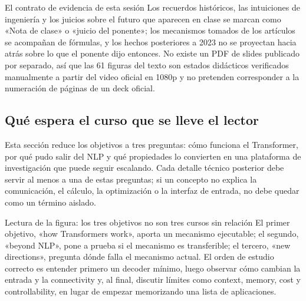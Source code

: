 \begin{importantbox}{El contrato de evidencia de esta sesión}
Los recuerdos históricos, las intuiciones de ingeniería y los juicios sobre el futuro que aparecen en clase se marcan como «Nota de clase» o «juicio del ponente»; los mecanismos tomados de los artículos se acompañan de fórmulas, y los hechos posteriores a 2023 no se proyectan hacia atrás sobre lo que el ponente dijo entonces. No existe un PDF de slides publicado por separado, así que las 61 figuras del texto son estados didácticos verificados manualmente a partir del video oficial en 1080p y no pretenden corresponder a la numeración de páginas de un deck oficial.
\end{importantbox}

\subsection{Qué espera el curso que se lleve el lector}

Esta sección reduce los objetivos a tres preguntas: cómo funciona el Transformer, por qué pudo salir del NLP y qué propiedades lo convierten en una plataforma de investigación que puede seguir escalando. Cada detalle técnico posterior debe servir al menos a una de estas preguntas; si un concepto no explica la comunicación, el cálculo, la optimización o la interfaz de entrada, no debe quedar como un término aislado.


\begin{knowledgebox}{Lectura de la figura: los tres objetivos no son tres cursos sin relación}
El primer objetivo, «how Transformers work», aporta un mecanismo ejecutable; el segundo, «beyond NLP», pone a prueba si el mecanismo es transferible; el tercero, «new directions», pregunta dónde falla el mecanismo actual. El orden de estudio correcto es entender primero un decoder mínimo, luego observar cómo cambian la entrada y la connectivity y, al final, discutir límites como context, memory, cost y controllability, en lugar de empezar memorizando una lista de aplicaciones.
\end{knowledgebox}


